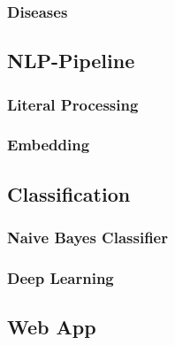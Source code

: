 \subsubsection{Diseases}

\subsection{NLP-Pipeline}
\subsubsection{Literal Processing}
\subsubsection{Embedding}

\subsection{Classification}
\subsubsection{Naive Bayes Classifier}
\subsubsection{Deep Learning}

\subsection{Web App}
